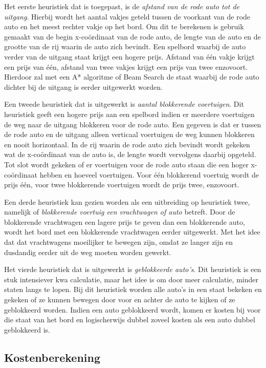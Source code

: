 \documentclass[a4paper]{article}
\begin{document}
    Het eerste heuristiek dat is toegepast, is de \textit{afstand van de rode auto tot de uitgang}. Hierbij wordt het aantal vakjes geteld tussen de voorkant van de rode auto en het meest rechter vakje op het bord. Om dit te berekenen is gebruik gemaakt van de begin x-coördinaat van de rode auto, de lengte van de auto en de grootte van de rij waarin de auto zich bevindt. Een spelbord waarbij de auto verder van de uitgang staat krijgt een hogere prijs. Afstand van één vakje krijgt een prijs van één, afstand van twee vakjes krijgt een prijs van twee enzovoort. Hierdoor zal met een A* algoritme of Beam Search de staat waarbij de rode auto dichter bij de uitgang is eerder uitgewerkt worden. 

	Een tweede heuristiek dat is uitgewerkt is \textit{aantal blokkerende voertuigen}. Dit heuristiek geeft een hogere prijs aan een spelbord indien er meerdere voertuigen de weg naar de uitgang blokkeren voor de rode auto. Een gegeven is dat er tussen de rode auto en de uitgang alleen verticaal voertuigen de weg kunnen blokkeren en nooit horizontaal. In de rij waarin de rode auto zich bevindt wordt gekeken wat de x-coördinaat van de auto is, de lengte wordt vervolgens daarbij opgeteld. Tot slot wordt gekeken of er voertuigen voor de rode auto staan die een hoger x-coördinaat hebben en hoeveel voertuigen. Voor één blokkerend voertuig wordt de prijs één, voor twee blokkerende voertuigen wordt de prijs twee, enzovoort. 
    
    Een derde heuristiek kan gezien worden als een uitbreiding op heuristiek twee, namelijk of \textit{blokkerende voertuig een vrachtwagen of auto} betreft. Door de blokkerende vrachtwagen een lagere prijs te geven dan een blokkerende auto, wordt het bord met een blokkerende vrachtwagen eerder uitgewerkt. Met het idee dat dat vrachtwagens moeilijker te bewegen zijn, omdat ze langer zijn en dusdandig eerder uit de weg moeten worden gewerkt.
    
    Het vierde heuristiek dat is uitgewerkt is \textit{geblokkeerde auto's}. Dit heuristiek is een stuk intensiever kwa calculatie, maar het idee is om door meer calculatie, minder staten langs te lopen. Bij dit heuristiek worden alle auto's in een staat bekeken en gekeken of ze kunnen bewegen door voor en achter de auto te kijken of ze geblokkeerd worden. Indien een auto geblokkeerd wordt, komen er kosten bij voor die staat van het bord en logischerwijs dubbel zoveel kosten als een auto dubbel geblokkeerd is.
    
\subsection{Kostenberekening}
\end{document}
